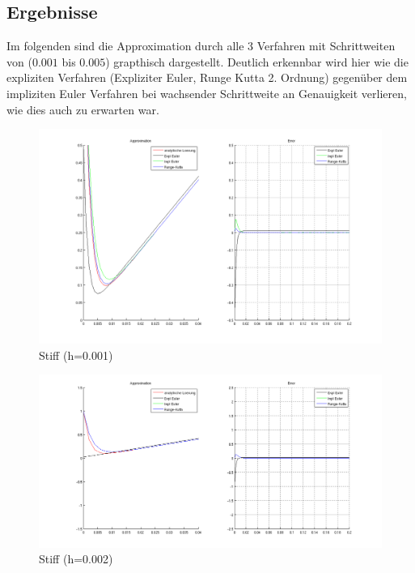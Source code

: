 \documentclass[10pt]{scrartcl}
\begin{document}
	\subsection{Ergebnisse}
	Im folgenden sind die Approximation durch alle 3 Verfahren mit Schrittweiten von ($0.001$ bis $0.005$) grapthisch dargestellt. Deutlich erkennbar wird hier wie die expliziten Verfahren (Expliziter Euler, Runge Kutta 2. Ordnung) gegenüber dem impliziten Euler Verfahren bei wachsender Schrittweite an Genauigkeit verlieren, wie dies auch zu erwarten war.

		\begin{figure}[H]
			\centering	
			\includegraphics[width=\textwidth]{stiff0001.png}
            \caption{Stiff (h=0.001)}
            \label{pic:stuff001}
		\end{figure} 
	
	
	\begin{figure}[H]
			\centering	
			\includegraphics[width=\textwidth]{stiff0002.png}
            \caption{Stiff (h=0.002)}
            \label{pic:stuff002}
		\end{figure} 
	
\end{document}
